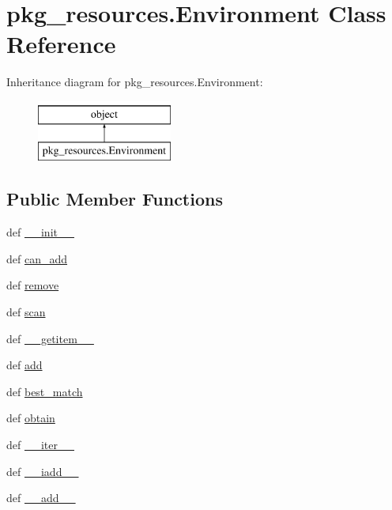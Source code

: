 \hypertarget{classpkg__resources_1_1Environment}{}\section{pkg\+\_\+resources.\+Environment Class Reference}
\label{classpkg__resources_1_1Environment}
Inheritance diagram for pkg\+\_\+resources.\+Environment\+:\begin{figure}[H]
\begin{center}
\leavevmode
\includegraphics[height=2.000000cm]{classpkg__resources_1_1Environment}
\end{center}
\end{figure}
\subsection*{Public Member Functions}
\begin{DoxyCompactItemize}
\item 
def \hyperlink{classpkg__resources_1_1Environment_ac15e05d14e6475ed369db90efc3d350c}{\+\_\+\+\_\+init\+\_\+\+\_\+}
\item 
def \hyperlink{classpkg__resources_1_1Environment_a81d5918c7d118ced6693d5db83e0fc91}{can\+\_\+add}
\item 
def \hyperlink{classpkg__resources_1_1Environment_a5ecc4750b6dcb9fba359f2719b93f67d}{remove}
\item 
def \hyperlink{classpkg__resources_1_1Environment_a44e26aeb444b865e68ad9dceb4669c68}{scan}
\item 
def \hyperlink{classpkg__resources_1_1Environment_a4e2c4438bce24043acfc619a4fda5fd4}{\+\_\+\+\_\+getitem\+\_\+\+\_\+}
\item 
def \hyperlink{classpkg__resources_1_1Environment_a94cc0523c3fc622e950e2249d2837754}{add}
\item 
def \hyperlink{classpkg__resources_1_1Environment_ac4bda4b5d23fc0c29382dd0ff2a2c8e6}{best\+\_\+match}
\item 
def \hyperlink{classpkg__resources_1_1Environment_a43b46fecb369a5c188da989afd58b85d}{obtain}
\item 
def \hyperlink{classpkg__resources_1_1Environment_a362f5291a6a550f2ccc6cafc0ad030d6}{\+\_\+\+\_\+iter\+\_\+\+\_\+}
\item 
def \hyperlink{classpkg__resources_1_1Environment_afaf155ef9d5195cfbd58fdff4a6d9b27}{\+\_\+\+\_\+iadd\+\_\+\+\_\+}
\item 
def \hyperlink{classpkg__resources_1_1Environment_aafae9e37e6ab14ac0df701814df75979}{\+\_\+\+\_\+add\+\_\+\+\_\+}
\end{DoxyCompactItemize}
